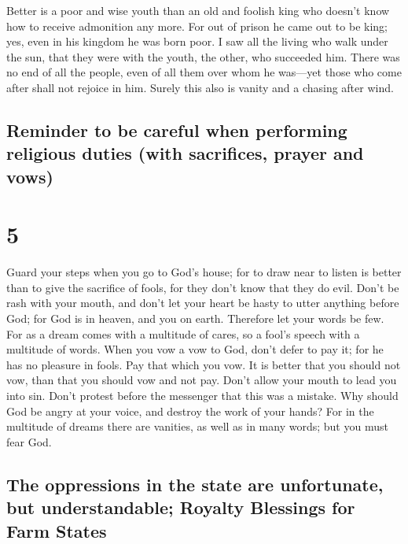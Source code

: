  Better is a poor and wise youth than an old and foolish
king who doesn't know how to receive admonition any more.
 For out of prison he came out to be king; yes, even in
his kingdom he was born poor.  I saw all the living who
walk under the sun, that they were with the youth, the other, who
succeeded him.  There was no end of all the people, even
of all them over whom he was---yet those who come after shall not
rejoice in him. Surely this also is vanity and a chasing after wind.

\hypertarget{reminder-to-be-careful-when-performing-religious-duties-with-sacrifices-prayer-and-vows}{%
\subsection{Reminder to be careful when performing religious duties
(with sacrifices, prayer and
vows)}\label{reminder-to-be-careful-when-performing-religious-duties-with-sacrifices-prayer-and-vows}}

\hypertarget{section-4}{%
\section{5}\label{section-4}}

 Guard your steps when you go to God's house; for to draw
near to listen is better than to give the sacrifice of fools, for they
don't know that they do evil.  Don't be rash with your
mouth, and don't let your heart be hasty to utter anything before God;
for God is in heaven, and you on earth. Therefore let your words be few.
 For as a dream comes with a multitude of cares, so a
fool's speech with a multitude of words.  When you vow a
vow to God, don't defer to pay it; for he has no pleasure in fools. Pay
that which you vow.  It is better that you should not vow,
than that you should vow and not pay.  Don't allow your
mouth to lead you into sin. Don't protest before the messenger that this
was a mistake. Why should God be angry at your voice, and destroy the
work of your hands?  For in the multitude of dreams there
are vanities, as well as in many words; but you must fear God.

\hypertarget{the-oppressions-in-the-state-are-unfortunate-but-understandable-royalty-blessings-for-farm-states}{%
\subsection{The oppressions in the state are unfortunate, but
understandable; Royalty Blessings for Farm
States}\label{the-oppressions-in-the-state-are-unfortunate-but-understandable-royalty-blessings-for-farm-states}}

